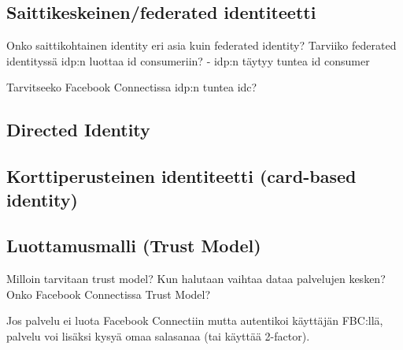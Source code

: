\documentclass[finnish,gradu]{tktltiki}
\begin{document}

  \subsection{Saittikeskeinen/federated identiteetti} %
  \label{sub:saittikeskeinen_identiteetti}
  Onko saittikohtainen identity eri asia kuin federated identity?
  Tarviiko federated identityssä idp:n luottaa id consumeriin?
  - idp:n täytyy tuntea id consumer

  Tarvitseeko Facebook Connectissa idp:n tuntea idc?



  \subsection{Directed Identity} %
  \label{sub:directed_identity}


  \subsection{Korttiperusteinen identiteetti (card-based identity)} %
  \label{sub:korttiperusteinen_identiteetti_card_based_identity_}

  \subsection{Luottamusmalli (Trust Model)} %
  \label{sub:luottamusmalli_trust_model_}
  Milloin tarvitaan trust model? Kun halutaan vaihtaa dataa palvelujen kesken? Onko Facebook Connectissa Trust Model?

  Jos palvelu ei luota Facebook Connectiin mutta autentikoi käyttäjän FBC:llä, palvelu voi lisäksi kysyä omaa salasanaa (tai käyttää 2-factor).
\end{document}
